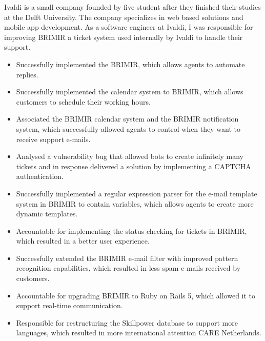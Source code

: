 {
  Ivaldi is a small company founded by five student after they finished their
  studies at the Delft University. The company specializes in web based
  solutions and mobile app development. As a software engineer at Ivaldi, I was responsible for improving BRIMIR a
  ticket system used internally by Ivaldi to handle their support.

  \SmallSep

  \begin{itemize}
    \item Successfully implemented the BRIMIR, which allows agents to automate
      replies.
    \item Successfully implemented the calendar system to BRIMIR, which allows
      customers to schedule their working hours.
    \item Associated the BRIMIR calendar system and the BRIMIR notification
      system, which successfully allowed agents to control when they want to
      receive support e-mails.
    \item Analysed a vulnerability bug that allowed bots to create infinitely
      many tickets and in response delivered a solution by implementing a
      CAPTCHA authentication.
    \item Successfully implemented a regular expression parser for the e-mail
      template system in BRIMIR to contain variables, which allows agents to
      create more dynamic templates.
    \item Accountable for implementing the status checking for tickets in
      BRIMIR, which resulted in a better user experience.
  \end{itemize}

    \framebreak
    \framebreak

  \begin{itemize}
    \item Successfully extended the BRIMIR e-mail filter with improved pattern
      recognition capabilities, which resulted in less spam e-mails received by
      customers.
    \item Accountable for upgrading BRIMIR to Ruby on Rails 5, which allowed
      it to support real-time communication.
    \item Responsible for restructuring the Skillpower database to support more
      languages, which resulted in more international attention CARE
      Netherlands.
  \end{itemize}

}

\SmallSep


